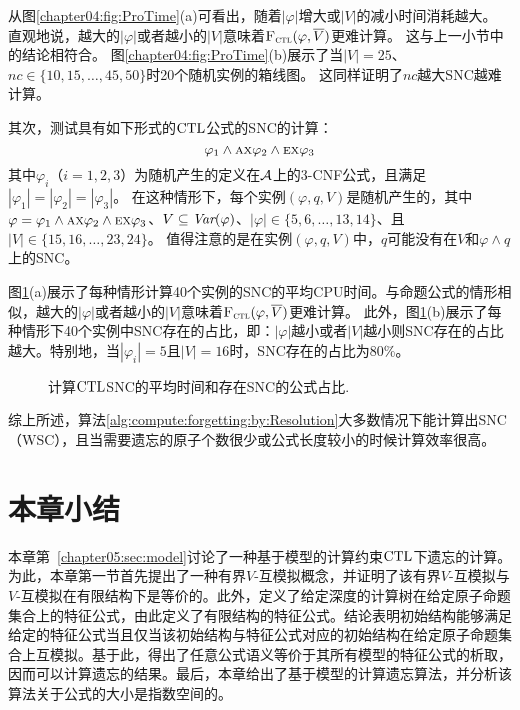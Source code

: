 从图\ref{chapter04:fig:ProTime}(a)可看出，随着$|\varphi|$增大或$|V|$的减小时间消耗越大。
直观地说，越大的$|\varphi|$或者越小的$|V|$意味着${\textsc{F}_{\textsc{ctl}}}(\varphi, \overline{V})$更难计算。
这与上一小节中的结论相符合。
图\ref{chapter04:fig:ProTime}(b)展示了当$|V|= 25$、$nc\in \{10,15,\dots, 45, 50\}$时20个随机实例的箱线图。
这同样证明了$nc$越大SNC越难计算。


其次，测试具有如下形式的$\textrm{CTL}$公式的SNC的计算：
$$\varphi_1 \wedge \textsc{a} \textsc{x} \varphi_2 \wedge \textsc{e}\textsc{x} \varphi_3$$
其中$\varphi_i$（$i=1,2,3$）为随机产生的定义在${\cal A}$上的3-CNF公式，且满足$|\varphi_1|=|\varphi_2|=|\varphi_3|$。
在这种情形下，每个实例$(\varphi, q, V)$是随机产生的，其中$\varphi=\varphi_1 \wedge \textsc{a} \textsc{x} \varphi_2 \wedge \textsc{e}\textsc{x} \varphi_3$、$V\subseteq \textit{Var}(\varphi)$、$|\varphi|\in \{5,6,\dots, 13,14\}$、且$|V|\in \{15,16,\dots, 23,24\}$。
值得注意的是在实例$(\varphi, q, V)$中，$q$可能没有在$V$和$\varphi\wedge q$上的SNC。

图\ref{chapter04:fig:CtlTime}(a)展示了每种情形计算40个实例的SNC的平均CPU时间。与命题公式的情形相似，越大的$|\varphi|$或者越小的$|V|$意味着${\textsc{F}_{\textsc{ctl}}}(\varphi, \overline{V})$更难计算。
此外，图\ref{chapter04:fig:CtlTime}(b)展示了每种情形下40个实例中SNC存在的占比，即：$|\varphi|$越小或者$|V|$越小则SNC存在的占比越大。特别地，当$|\varphi_i|=5$且$|V|=16$时，SNC存在的占比为80\%。



\begin{figure*}[!htb]
	\centering
	\caption{计算$\textrm{CTL}$SNC的平均时间和存在SNC的公式占比.}
	\label{chapter04:fig:CtlTime}
\end{figure*}

综上所述，算法\ref{alg:compute:forgetting:by:Resolution}大多数情况下能计算出SNC（WSC），且当需要遗忘的原子个数很少或公式长度较小的时候计算效率很高。


\section{本章小结} 
本章第~\ref{chapter05:sec:model}讨论了一种基于模型的计算约束$\textrm{CTL}$下遗忘的计算。为此，本章第一节首先提出了一种有界$V$-互模拟概念，并证明了该有界$V$-互模拟与$V$-互模拟在有限结构下是等价的。此外，定义了给定深度的计算树在给定原子命题集合上的特征公式，由此定义了有限结构的特征公式。结论表明初始结构能够满足给定的特征公式当且仅当该初始结构与特征公式对应的初始结构在给定原子命题集合上互模拟。基于此，得出了任意公式语义等价于其所有模型的特征公式的析取，因而可以计算遗忘的结果。最后，本章给出了基于模型的计算遗忘算法，并分析该算法关于公式的大小是指数空间的。


